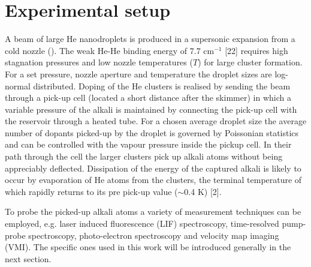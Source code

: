 	\section*{Experimental setup}
	A beam of large He nanodroplets is produced in a supersonic expansion from a cold nozzle (). The weak He-He binding energy of 7.7 cm$^{-1}$ [22] requires high stagnation pressures and low nozzle temperatures ($T$) for large cluster formation. For a set pressure, nozzle aperture and temperature the droplet sizes are log-normal distributed. Doping of the He clusters is realised by sending the beam through a pick-up cell (located a short distance after the skimmer) in which a variable pressure of the alkali is maintained by connecting the pick-up cell with the reservoir through a heated tube. For a chosen average droplet size the average number of dopants picked-up by the droplet is governed by Poissonian statistics and can be controlled with the vapour pressure inside the pickup cell. In their path through the cell the larger clusters pick up alkali atoms without being appreciably deflected. Dissipation of the energy of the captured alkali is likely to occur by evaporation of He atoms from the clusters, the terminal temperature of which rapidly returns to its pre pick-up value ($\sim$0.4 K) [2].

	To probe the picked-up alkali atoms a variety of measurement techniques can be employed, e.g. laser induced fluorescence (LIF) spectroscopy, time-resolved pump-probe spectroscopy, photo-electron spectroscopy and velocity map imaging (VMI). The specific ones used in this work will be introduced generally in the next section.%
\clearpage{\pagestyle{empty}\cleardoublepage}